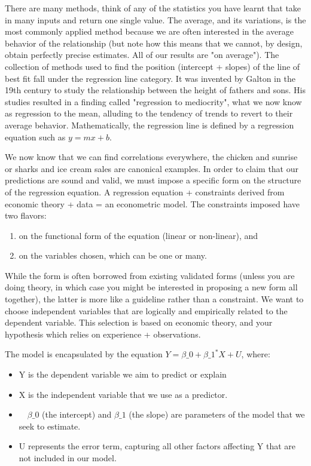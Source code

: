 \documentclass[10pt]{article}
\begin{document}
There are many methods, think of any of the statistics you have learnt that take in many inputs and return one single value. The average, and its variations, is the most commonly applied method because we are often interested in the average behavior of the relationship (but note how this means that we cannot, by design, obtain perfectly precise estimates. All of our results are "on average"). The collection of methods used to find the position (intercept + slopes) of the line of best fit fall under the regression line category. It was invented by Galton in the 19th century to study the relationship between the height of fathers and sons. His studies resulted in a finding called "regression to mediocrity", what we now know as regression to the mean, alluding to the tendency of trends to revert to their average behavior. Mathematically, the regression line is defined by a regression equation such as $y=m x+b$.

We now know that we can find correlations everywhere, the chicken and sunrise or sharks and ice cream sales are canonical examples. In order to claim that our predictions are sound and valid, we must impose a specific form on the structure of the regression equation. A regression equation + constraints derived from economic theory + data = an econometric model. The constraints imposed have two flavors:

\begin{enumerate}
  \item on the functional form of the equation (linear or non-linear), and
  \item on the variables chosen, which can be one or many.
\end{enumerate}

While the form is often borrowed from existing validated forms (unless you are doing theory, in which case you might be interested in proposing a new form all together), the latter is more like a guideline rather than a constraint. We want to choose independent variables that are logically and empirically related to the dependent variable. This selection is based on economic theory, and your hypothesis which relies on experience + observations.

The model is encapsulated by the equation $Y=\beta \_0+\beta \_1^{*} X+U$, where:

\begin{itemize}
  \item Y is the dependent variable we aim to predict or explain
  \item X is the independent variable that we use as a predictor.
  \item $\quad \beta \_0$ (the intercept) and $\beta \_1$ (the slope) are parameters of the model that we seek to estimate.
  \item U represents the error term, capturing all other factors affecting Y that are not included in our model.
\end{itemize}
\end{document}
